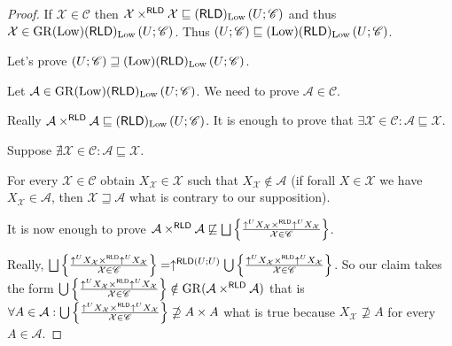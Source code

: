 \begin{proof}
  If $\mathcal{X} \in \mathscr{C}$ then $\mathcal{X}
  \times^{\mathsf{RLD}} \mathcal{X} \sqsubseteq
  (\mathsf{RLD})_{\operatorname{Low}} \left( U ; \mathscr{C} \right)$ and thus
  $\mathcal{X} \in \operatorname{GR} (\operatorname{Low}) (\mathsf{RLD})_{\operatorname{Low}}
  \left( U ; \mathscr{C} \right)$. Thus $\left( U ; \mathscr{C} \right)
  \sqsubseteq (\operatorname{Low}) (\mathsf{RLD})_{\operatorname{Low}} \left( U ;
  \mathscr{C} \right)$.
  
  Let's prove $\left( U ; \mathscr{C} \right) \sqsupseteq (\operatorname{Low})
  (\mathsf{RLD})_{\operatorname{Low}} \left( U ; \mathscr{C} \right)$.
  
  Let $\mathcal{A} \in \operatorname{GR} (\operatorname{Low})
  (\mathsf{RLD})_{\operatorname{Low}} \left( U ; \mathscr{C} \right)$. We need
  to prove $\mathcal{A} \in \mathscr{C}$.
  
  Really $\mathcal{A} \times^{\mathsf{RLD}} \mathcal{A} \sqsubseteq
  (\mathsf{RLD})_{\operatorname{Low}} \left( U ; \mathscr{C} \right)$. It is
  enough to prove that $\exists \mathcal{X} \in \mathscr{C} : \mathcal{A}
  \sqsubseteq \mathcal{X}$.
  
  Suppose $\nexists \mathcal{X} \in \mathscr{C} : \mathcal{A} \sqsubseteq
  \mathcal{X}$.
  
  For every $\mathcal{X} \in \mathscr{C}$ obtain $X_{\mathcal{X}} \in
  \mathcal{X}$ such that $X_{\mathcal{X}} \notin \mathcal{A}$ (if forall $X \in
  \mathcal{X}$ we have $X_{\mathcal{X}} \in \mathcal{A}$, then $\mathcal{X}
  \sqsupseteq \mathcal{A}$ what is contrary to our supposition).
  
  It is now enough to prove $\mathcal{A} \times^{\mathsf{RLD}}
  \mathcal{A} \nsqsubseteq \bigsqcup \setcond{ \uparrow^U
  X_{\mathcal{X}} \times^{\mathsf{RLD}} \uparrow^U X_{\mathcal{X}}
  }{\mathcal{X} \in \mathscr{C} }$.
  
  Really, $\bigsqcup \setcond{ \uparrow^U X_{\mathcal{X}}
  \times^{\mathsf{RLD}} \uparrow^U X_{\mathcal{X}} }{
  \mathcal{X} \in \mathscr{C} } =
  \uparrow^{\mathsf{RLD} (U ; U)} \bigcup \setcond{ \uparrow^U X_{\mathcal{X}}
  \times^{\mathsf{RLD}} \uparrow^U X_{\mathcal{X}} }{
  \mathcal{X} \in \mathscr{C} }$. So our claim takes the form $\bigcup \left\{ \frac{ \uparrow^U X_{\mathcal{X}}
  \times^{\mathsf{RLD}} \uparrow^U X_{\mathcal{X}} }{
  \mathcal{X} \in \mathscr{C} }\right\} \notin \operatorname{GR} (\mathcal{A}
  \times^{\mathsf{RLD}} \mathcal{A})$ that is $\forall A \in
  \mathcal{A} : \bigcup \left\{ \frac{ \uparrow^U X_{\mathcal{X}}
  \times^{\mathsf{RLD}} \uparrow^U X_{\mathcal{X}} }{
  \mathcal{X} \in \mathscr{C} }\right\} \nsupseteq
  A \times A$ what is true because $X_{\mathcal{X}} \nsupseteq A$ for every $A
  \in \mathcal{A}$.
\end{proof}

